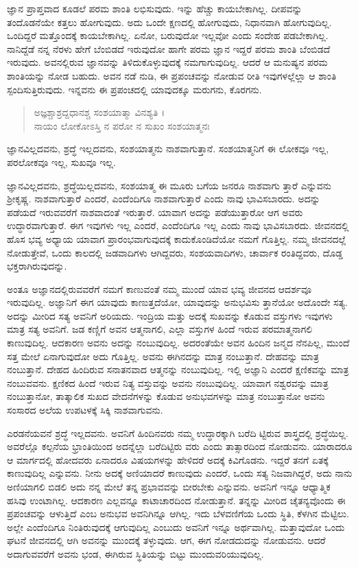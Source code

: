 ಜ್ಞಾನ ಪ್ರಾಪ್ತವಾದ ಕೂಡಲೆ ಪರಮ ಶಾಂತಿ ಲಭಿಸುವುದು. ಇನ್ನು ಹೆಚ್ಚು ಕಾಯಬೇಕಾಗಿಲ್ಲ. ದೀಪವನ್ನು ತಂದೊಡನೆಯೇ ಕತ್ತಲು ಹೋಗುವುದು. ಅದು ಒಂದೇ ಕ್ಷಣದಲ್ಲಿ ಹೋಗುವುದು, ನಿಧಾನವಾಗಿ ಹೋಗುವುದಿಲ್ಲ. ಒಂದಿದ್ದರೆ ಮತ್ತೊಂದಕ್ಕೆ ಕಾಯಬೇಕಾಗಿಲ್ಲ. ಏನೋ, ಬರುವುದೋ ಇಲ್ಲವೋ ಎಂದು ಸಂದೇಹ ಪಡಬೇಕಾಗಿಲ್ಲ. ನಾನಿದ್ದೆಡೆ ನನ್ನ ನೆರಳು ಹೇಗೆ ಬೆಂಬಿಡದೆ ಇರುವುದೋ ಹಾಗೇ ಪರಮ ಜ್ಞಾನ ಇದ್ದರೆ ಪರಮ ಶಾಂತಿ ಬೆಂಬಿಡದೆ ಇರುವುದು. ಅವನಲ್ಲಿರುವ ಜ್ಞಾನವನ್ನು ತಿಳಿದುಕೊಳ್ಳುವುದಕ್ಕೆ ನಮಗಾಗುವುದಿಲ್ಲ. ಆದರೆ ಆ ಮನುಷ್ಯನ ಪರಮ ಶಾಂತಿಯನ್ನು ನೋಡ ಬಹುದು. ಅವನ ನಡೆ ನುಡಿ, ಈ ಪ್ರಪಂಚವನ್ನು ನೋಡುವ ರೀತಿ ಇವುಗಳಲ್ಲೆಲ್ಲಾ ಆ ಶಾಂತಿ ಸ್ಪಂದಿಸುತ್ತಿರುವುದು. ಇನ್ನವನು ಈ ಪ್ರಪಂಚದಲ್ಲಿ ಯಾವುದಕ್ಕೂ ಮರುಗನು, ಕೊರಗನು.

\begin{verse}
ಅಜ್ಞಶ್ಚಾಶ್ರದ್ದಧಾನಶ್ಚ ಸಂಶಯಾತ್ಮಾ ವಿನಶ್ಯತಿ ।\\ನಾಯಂ ಲೋಕೋಽಸ್ತಿ ನ ಪರೋ ನ ಸುಖಂ ಸಂಶಯಾತ್ಮನಃ 
\end{verse}

{\small ಜ್ಞಾನವಿಲ್ಲದವನು, ಶ್ರದ್ಧೆ ಇಲ್ಲದವನು, ಸಂಶಯಾತ್ಮನು ನಾಶವಾಗುತ್ತಾನೆ. ಸಂಶಯಾತ್ಮನಿಗೆ ಈ ಲೋಕವೂ ಇಲ್ಲ, ಪರಲೋಕವೂ ಇಲ್ಲ, ಸುಖವೂ ಇಲ್ಲ.}

ಜ್ಞಾನವಿಲ್ಲದವನು, ಶ್ರದ್ಧೆಯಿಲ್ಲದವನು, ಸಂಶಯಾತ್ಮ ಈ ಮೂರು ಬಗೆಯ ಜನರೂ ನಾಶವಾಗು ತ್ತಾರೆ ಎನ್ನುವನು ಶ್ರೀಕೃಷ್ಣ. ನಾಶವಾಗುತ್ತಾರೆ ಎಂದರೆ, ಎಂದೆಂದಿಗೂ ನಾಶವಾಗುತ್ತಾರೆ ಎಂದು ನಾವು ಭಾವಿಸಬಾರದು. ಅದನ್ನು ಪಡೆಯದೆ ಇರುವವರೆಗೆ ನಾಶವಾದಂತೆ ಇರುತ್ತಾರೆ. ಯಾವಾಗ ಅದನ್ನು ಪಡೆಯುತ್ತಾರೋ ಆಗ ಅವರು ಉದ್ಧಾರವಾಗುತ್ತಾರೆ. ಈಗ ಇವುಗಳು ಇಲ್ಲ ಎಂದರೆ, ಎಂದೆಂದಿಗೂ ಇಲ್ಲ ಎಂದು ನಾವು ಭಾವಿಸಬಾರದು. ಜೀವನದಲ್ಲಿ ಹೊಸ ಭವ್ಯ ಅಧ್ಯಾಯ ಯಾವಾಗ ಪ್ರಾರಂಭವಾಗುವುದಕ್ಕೆ ಕಾದುಕೊಂಡಿದೆಯೋ ನಮಗೆ ಗೊತ್ತಿಲ್ಲ. ನಮ್ಮ ಜೀವನದಲ್ಲೆ ನೋಡುತ್ತೇವೆ, ಒಂದು ಕಾಲದಲ್ಲಿ ಜಡವಾದಿಗಳು ಆಗಿದ್ದವರು, ಸಂಶಯವಾದಿಗಳು, ಚಾರ್ವಾಕ ರಂತಿದ್ದವರು, ದೊಡ್ಡ ಭಕ್ತರಾಗಿರುವುದನ್ನು.

ಅಂತೂ ಅಜ್ಞಾನದಲ್ಲಿರುವವರೆಗೆ ನಮಗೆ ಕಾಣುವಂತೆ ನಮ್ಮ ಮುಂದೆ ಯಾವ ಭವ್ಯ ಜೀವನದ ಆದರ್ಶವೂ ಇರುವುದಿಲ್ಲ. ಅಜ್ಞಾನಿಗೆ ಈಗ ಯಾವುದು ಕಾಣುತ್ತದೆಯೋ, ಯಾವುದನ್ನು ಅನುಭವಿಸು ತ್ತಾನೆಯೋ ಅದೊಂದೇ ಸತ್ಯ. ಅದನ್ನು ಮೀರಿದ ಸತ್ಯ ಅವನಿಗೆ ಅರಿಯದು. ಇಂದ್ರಿಯ ಮತ್ತು ಅದಕ್ಕೆ ಸುಖವನ್ನು ಕೊಡುವ ವಸ್ತುಗಳು ಇವುಗಳು ಮಾತ್ರ ಸತ್ಯ ಅವನಿಗೆ. ಜಡ ಕಣ್ಣಿಗೆ ಅವನ ಆತ್ಮನಾಗಲಿ, ಎಲ್ಲಾ ವಸ್ತುಗಳ ಹಿಂದೆ ಇರುವ ಪರಮಾತ್ಮನಾಗಲಿ ಕಾಣುವುದಿಲ್ಲ. ಆದಕಾರಣ ಅವನು ಅದನ್ನು ನಂಬುವುದಿಲ್ಲ. ಅದರಂತೆಯೇ ಅವನ ಹಿಂದಿನ ಜನ್ಮದ ನೆನಪಿಲ್ಲ, ಮುಂದೆ ಸತ್ತ ಮೇಲೆ ಏನಾಗುವುದೋ ಅದು ಗೊತ್ತಿಲ್ಲ. ಅವನು ಈಗಿನದನ್ನು ಮಾತ್ರ ನಂಬುತ್ತಾನೆ. ದೇಹವನ್ನು ಮಾತ್ರ ನಂಬುತ್ತಾನೆ. ದೇಹದ ಹಿಂದಿರುವ ಸನಾತನವಾದ ಆತ್ಮನನ್ನು ನಂಬುವುದಿಲ್ಲ. ಇಲ್ಲಿ ಅಜ್ಞಾನಿ ಎಂದರೆ ಕ್ಷಣಿಕವನ್ನು ಮಾತ್ರ ನಂಬುವವನು. ಕ್ಷಣಿಕದ ಹಿಂದೆ ಇರುವ ನಿತ್ಯ ವಸ್ತುವನ್ನು ಅವನು ನಂಬುವುದಿಲ್ಲ. ಯಾವಾಗ ನಶ್ವರವನ್ನು ಮಾತ್ರ ನಂಬುತ್ತಾನೋ, ತಾತ್ಕಾಲಿಕ ಸುಖದ ವೇದನೆಗಳನ್ನು ಕೊಡುವ ಅನುಭವಗಳನ್ನು ಮಾತ್ರ ನಂಬುತ್ತಾನೋ ಅವನು ಸಂಸಾರದ ಅಲೆಯ ಉಪಟಳಕ್ಕೆ ಸಿಕ್ಕಿ ನಾಶವಾಗುವನು.

ಎರಡನೆಯವನೆ ಶ್ರದ್ಧೆ ಇಲ್ಲದವನು. ಅವನಿಗೆ ಹಿಂದಿನವರು ನಮ್ಮ ಉದ್ಧಾರಕ್ಕಾಗಿ ಬರೆದಿ ಟ್ಟಿರುವ ಶಾಸ್ತ್ರದಲ್ಲಿ ಶ್ರದ್ಧೆಯಿಲ್ಲ. ಅವರೆಲ್ಲೊ ಕಲ್ಪನೆಯ ಭ್ರಾಂತಿಯಿಂದ ಅದನ್ನೆಲ್ಲಾ ಬರೆದಿಟ್ಟಿರು ವರು ಎಂದು ತಾತ್ಸಾರದಿಂದ ನೋಡುವನು. ಯಾರಾದರೂ ಆ ಮಾರ್ಗದಲ್ಲಿ ಹೋದವರು ಏನಾದರೂ ವಿಷಯಗಳನ್ನು ಹೇಳಿದರೆ ಅದಕ್ಕೆ ಕಿವಿಗೊಡನು. ಇದ್ದರೆ ತನಗೆ ಏತಕ್ಕೆ ಕಾಣುವುದಿಲ್ಲ ಎನ್ನುವನು. ನೀನು ಅದಕ್ಕೆ ಅಣಿಯಾದರೆ ಕಾಣುವುದು ಎಂದರೆ, ಒಂದು ಸತ್ಯ ನಿಜವಾಗಿದ್ದರೆ, ಅದು ನಾನು ಅಣಿಯಾಗಲಿ ಬಿಡಲಿ ಅದು ನನ್ನ ಮೇಲೆ ತನ್ನ ಪ್ರಭಾವವನ್ನು ಬೀರಬೇಕು ಎನ್ನುವನು. ಅವನಿಗೆ ಇನ್ನೂ ಆಧ್ಯಾತ್ಮಿಕ ಹಸಿವು ಉಂಟಾಗಿಲ್ಲ. ಆದಕಾರಣ ಎಲ್ಲವನ್ನೂ ಕಾಟಾಚಾರದಿಂದ ನೋಡುತ್ತಾನೆ. ತನ್ನನ್ನು ಮೀರಿದ ಚೈತನ್ಯವೊಂದು ಈ ಪ್ರಪಂಚವನ್ನು ಆಳುತ್ತಿದೆ ಎಂಬ ಅನುಭವ ಅವನಿಗಿನ್ನೂ ಆಗಿಲ್ಲ. ಇದು ಬೆಳವಣಿಗೆಯ ಒಂದು ಸ್ಥಿತಿ, ಕೆಳಗಿನ ಮೆಟ್ಟಿಲು. ಅಲ್ಲೇ ಎಂದೆಂದಿಗೂ ನಿಂತಿರುವುದಕ್ಕೆ ಆಗುವುದಿಲ್ಲ ಎಂಬುದು ಅವನಿಗೆ ಇನ್ನೂ ಅರ್ಥವಾಗಿಲ್ಲ. ಮತ್ತಾವುದೋ ಒಂದು ಘಟನೆ ಜೀವನದಲ್ಲಿ ಆಗಿ ಅವನನ್ನು ಮುಂದಕ್ಕೆ ತಳ್ಳುವುದು. ಆಗ, ಈಗ ನೋಡದುದನ್ನು ನೋಡುವನು. ಆದರೆ ಅದಾಗುವವರೆಗೆ ಅವನು ಭಂಡ, ಈಗಿರುವ ಸ್ಥಿತಿಯನ್ನು ಬಿಟ್ಟು ಮುಂದುವರಿಯುವುದಿಲ್ಲ.

